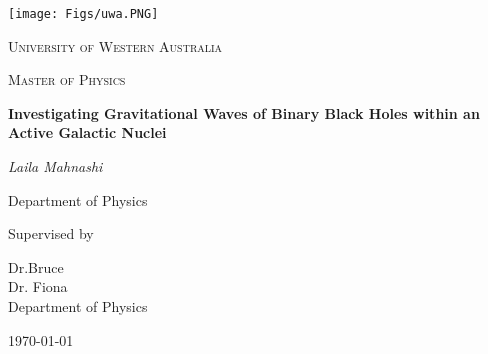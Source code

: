 \begin{titlepage}


\thispagestyle{empty}
\setlength\headheight{0pt} 
\begin{center}

\begin{center}
\texttt{[image: Figs/uwa.PNG]}            
\end{center}	

        \vspace{0.25cm}
        {\scshape\LARGE University of Western Australia \par}
        \vspace{0.25cm}
        {\scshape\Large Master of Physics \par}
        \vspace{0.5cm}

        {\Large\bfseries Investigating Gravitational Waves of Binary Black Holes within an Active Galactic Nuclei\par}
        
        \vspace{0.5cm}
        {\Large\itshape Laila Mahnashi\par}
        Department of Physics
        \vspace{0.25cm}

\vspace{1cm}
Supervised by\par
Dr.Bruce  \\Dr. Fiona\vspace{1.5cm} \\
Department of Physics\par
\vspace{0.25cm}
\large
\today

\end{center}

\clearpage
\restoregeometry
\end{titlepage}
